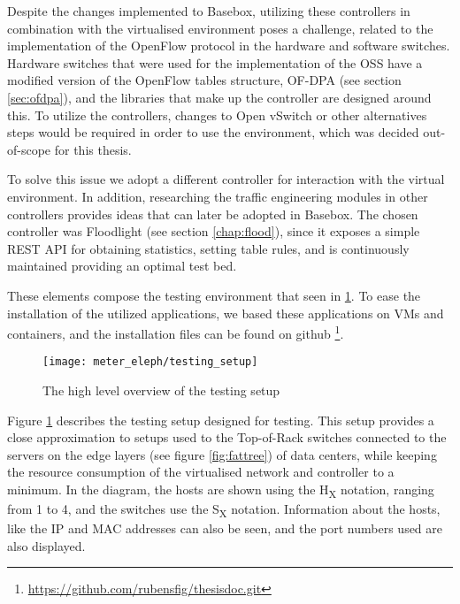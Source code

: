 \par Despite the changes implemented to Basebox, utilizing these controllers in combination with the virtualised environment poses a challenge, related 
to the implementation of the OpenFlow protocol in the hardware and software switches. Hardware switches that were used for the implementation of
the OSS have a modified version of the OpenFlow tables structure, OF-DPA (see section \ref{sec:ofdpa}), and the libraries that make up the 
controller are designed around this. To utilize the controllers, changes to Open vSwitch or other alternatives steps would be required in order to use the
environment, which was decided out-of-scope for this thesis.

\par To solve this issue we adopt a different controller for interaction with the virtual environment. In addition, researching the traffic engineering modules in
other controllers provides ideas that can later be adopted in Basebox. The chosen controller was Floodlight (see section \ref{chap:flood}), since it exposes a simple
REST API for obtaining statistics, setting table rules, and is continuously maintained providing an optimal test bed.

\par These elements compose the testing environment that seen in \ref{fig:test_setup}. To ease the installation of the utilized applications, 
we based these applications on VMs and containers, and the installation files can be found on github \footnote{\url{https://github.com/rubensfig/thesisdoc.git}}.

\begin{figure} [H]
    \centering
    \texttt{[image: meter\_eleph/testing\_setup]}
    \caption {The high level overview of the testing setup}
    \label{fig:test_setup}
\end{figure} 

\par Figure \ref{fig:test_setup} describes the testing setup designed for testing. This setup provides a close approximation to setups used
to the Top-of-Rack switches connected to the servers on the edge layers (see figure \ref{fig:fattree}) of data centers, while keeping the resource consumption of
the virtualised network and controller to a minimum. In the diagram, the hosts are shown using the H\textsubscript{X} notation, ranging from 1 to 4, and the switches
use the S\textsubscript{X} notation. Information about the hosts, like the IP and MAC addresses can also be seen, and the port numbers used are also displayed.

